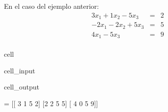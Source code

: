 \documentclass[letterpaper,10pt,english]{jupyterBook}
\begin{document}
\sphinxAtStartPar
En el caso del ejemplo anterior:
\begin{eqnarray*}
3x_1 + 1x_2 - 5x_3 &=& 2 \\
-2x_1 - 2x_2 + 5x_3 &=& 5 \\
4x_1 -5x_3  &=& 9 \\
\end{eqnarray*}
\begin{sphinxuseclass}{cell}\begin{sphinxVerbatimInput}

\begin{sphinxuseclass}{cell_input}
\begin{sphinxVerbatim}[commandchars=\\\{\}]
  \PYG{p}{[}\PYG{p}{[}\PYG{p}{]} \PYG{p}{[}\PYG{p}{]} \PYG{p}{[}\PYG{p}{]}\PYG{p}{]}
    
 
 
 
 \PYG{p}{[}\PYG{p}{]}
\end{sphinxVerbatim}

\end{sphinxuseclass}\end{sphinxVerbatimInput}
\begin{sphinxVerbatimOutput}

\begin{sphinxuseclass}{cell_output}
\begin{sphinxVerbatim}[commandchars=\\\{\}]
[A|y] =
 [[ 3  1 \PYGZhy{}5  2]
 [\PYGZhy{}2 \PYGZhy{}2  5  5]
 [ 4  0 \PYGZhy{}5  9]]



\end{sphinxVerbatim}
\end{sphinxuseclass}
\end{sphinxVerbatimOutput}
\end{sphinxuseclass}
\end{document}
